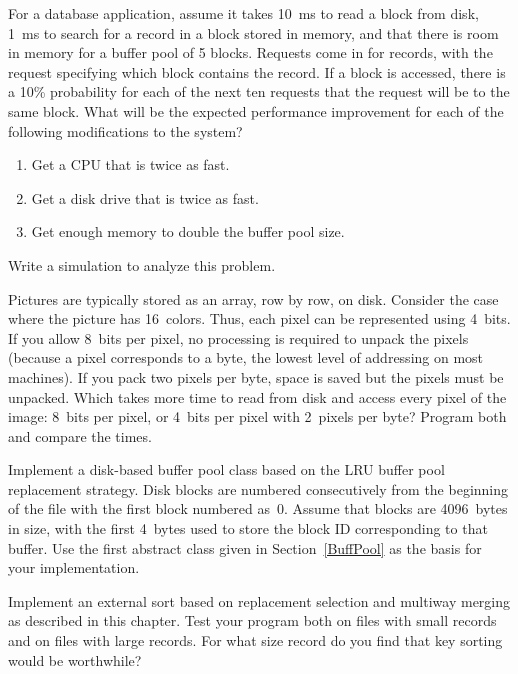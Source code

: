 \begin{projects}

\item
For a database application, assume it takes 10~ms to read a block
from disk, 1~ms to search for a record in a block stored in memory,
and that there is room in memory for a buffer pool of 5
blocks.
Requests come in for records, with the request specifying which block
contains the record.
If a block is accessed, there is a 10\% probability for each of the
next ten requests that the request will be to the same block.
What will be the expected performance improvement for each of the
following modifications to the system?

\begin{enumerate}
\item
Get a CPU that is twice as fast.

\item
Get a disk drive that is twice as fast.

\item
Get enough memory to double the buffer pool size.
\end{enumerate}

\noindent Write a simulation to analyze this problem.

\item
Pictures are typically stored as an array, row by row, on disk.
Consider the case where the picture has 16~colors.
Thus, each pixel can be represented using 4~bits.
If you allow 8~bits per pixel, no processing is required to unpack
the pixels (because a pixel corresponds to a byte, the lowest level of
addressing on most machines).
If you pack two pixels per byte, space is saved but the pixels must
be unpacked.
Which takes more time to read from disk and access every pixel of the image:
8~bits per pixel, or 4~bits per pixel with 2~pixels per byte?
Program both and compare the times.

\item
\label{bpProject}
Implement a disk-based buffer pool
class based on the LRU buffer pool replacement
strategy.
Disk blocks are numbered consecutively from the beginning of the file
with the first block numbered as~0.
Assume that blocks are 4096~bytes in size, with the first 4~bytes used
to store the block ID corresponding to that buffer.
Use the first  abstract class given in
Section~\ref{BuffPool} as the basis for your implementation.

\item
Implement an external sort
based on replacement selection
and multi\-way merging
as described in this chapter.
Test your program both on files with small records and on files with
large records.
For what size record do you find that key sorting would be worthwhile?


\end{projects}
